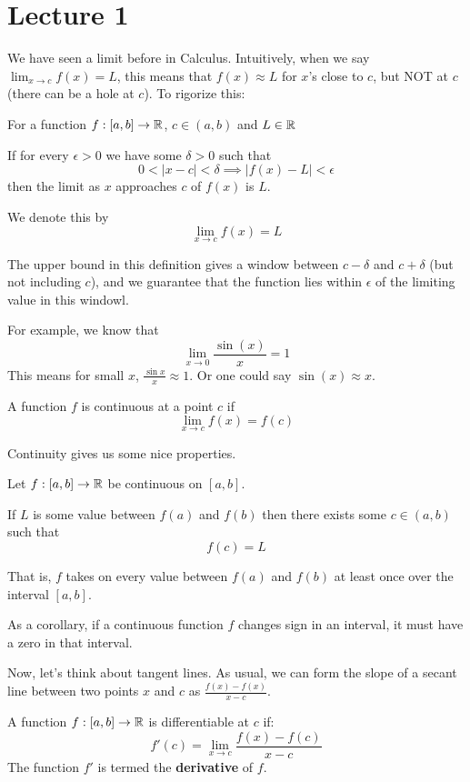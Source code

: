 \section{Lecture 1}
We have seen a limit before in Calculus. Intuitively, when we say $\lim_{x \to c} f(x) = L$, this means that
$f(x) \approx L$ for $x$'s close to $c$, but NOT at $c$ (there can be a hole at $c$). To rigorize this:
\begin{definition}[Limit]
    For a function $f: [a, b] \to \operatorname{\mathbb{R}}$, $c \in (a, b)$ and $L \in \operatorname{\mathbb{R}}$

    If for every $\epsilon > 0$ we have some $\delta > 0$ such that
    \[ 0 < |x - c| < \delta \implies |f(x) - L| < \epsilon \]
    then the limit as $x$ approaches $c$ of $f(x)$ is $L$.

    We denote this by
    \[ \lim_{x \to c} f(x) = L \]
\end{definition}
The upper bound in this definition gives a window between $c - \delta$ and $c + \delta$ (but not including $c$), and we guarantee that the function lies within $\epsilon$ of the limiting value in this windowl.

For example, we know that
\[ \lim_{x \to 0} \frac{\sin(x)} {x} = 1\]
This means for small $x$, $\frac{\sin x}{x} \approx 1$. Or one could say $\sin(x) \approx x$.

\begin{definition}[Continuity]
    A function $f$ is continuous at a point $c$ if
    \[ \lim_{x \to c} f(x) = f(c) \]
\end{definition}

Continuity gives us some nice properties.
\begin{theorem}
    Let $f: [a, b] \to \operatorname{\mathbb{R}}$ be continuous on $[a, b]$.

    If $L$ is some value between $f(a)$ and $f(b)$ then there exists some $c \in (a, b)$ such that
    \[ f(c) = L \]

    That is, $f$ takes on every value between $f(a)$ and $f(b)$ at least once over the interval $[a, b]$.
\end{theorem}
As a corollary, if a continuous function $f$ changes sign in an interval, it must have a zero in that interval.

Now, let's think about tangent lines. As usual, we can form the slope of a secant line between two points $x$ and $c$ as $\frac{f(x) - f(x)}{x - c}$.
\begin{definition}[Differentiability]
    A function $f: [a, b] \to \operatorname{\mathbb{R}}$ is differentiable at $c$ if:
    \[ f'(c) = \lim_{x \to c} \frac{f(x) - f(c)}{x - c} \]
    The function $f'$ is termed the \textbf{derivative} of $f$.
\end{definition}

